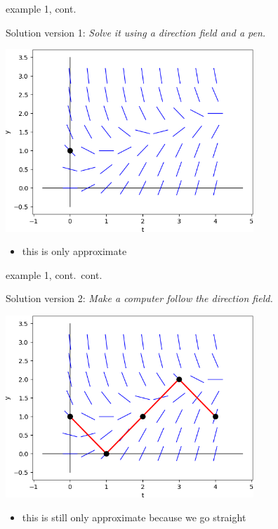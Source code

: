\documentclass{beamer}
\begin{document}
\begin{frame}{example 1, cont.}

Solution version 1: \emph{Solve it using a direction field and a pen.}

\bigskip
\hfill \includegraphics[width=0.7\textwidth]{figs/sequence-1}

\begin{itemize}
\item this is only approximate
\end{itemize}
\end{frame}


\begin{frame}{example 1, cont.~cont.}

Solution version 2: \emph{Make a computer follow the direction field.}

\bigskip
\hfill \includegraphics[width=0.7\textwidth]{figs/sequence-2}

\begin{itemize}
\item this is still only approximate because we go straight
\end{itemize}
\end{frame}
\end{document}
